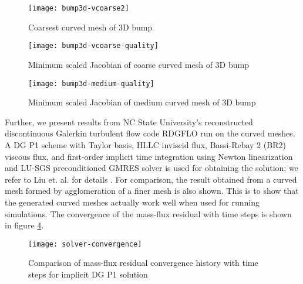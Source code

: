 \begin{figure}
 \centering
 \texttt{[image: bump3d-vcoarse2]}
 \caption{Coarsest curved mesh of 3D bump}
 \label{fig:bump3d}
\end{figure}

\begin{figure}
	\centering
	\texttt{[image: bump3d-vcoarse-quality]}
	\caption{Minimum scaled Jacobian of coarse curved mesh of 3D bump}
	\label{fig:bump3d-coarse-jac}
\end{figure}
\begin{figure}
	\centering
	\texttt{[image: bump3d-medium-quality]}
	\caption{Minimum scaled Jacobian of medium curved mesh of 3D bump}
	\label{fig:bump3d-medium-jac}
\end{figure}

Further, we present results from NC State University's reconstructed discontinuous Galerkin turbulent flow code RDGFLO run on the curved meshes. A DG P1 scheme with Taylor basis, HLLC inviscid flux, Bassi-Rebay 2 (BR2) viscous flux, and first-order implicit time integration using Newton linearization and LU-SGS preconditioned GMRES solver is used for obtaining the solution; we refer to Liu et. al. for details \cite{solver}. For comparison, the result obtained from a curved mesh formed by agglomeration of a finer mesh is also shown. This is to show that the generated curved meshes actually work well when used for running simulations. The convergence of the mass-flux residual with time steps is shown in figure \ref{fig:resconvergence}.
\begin{figure}
	\centering
	\texttt{[image: solver-convergence]}
	\caption{Comparison of mass-flux residual convergence history with time steps for implicit DG P1 solution}
	\label{fig:resconvergence}
\end{figure}